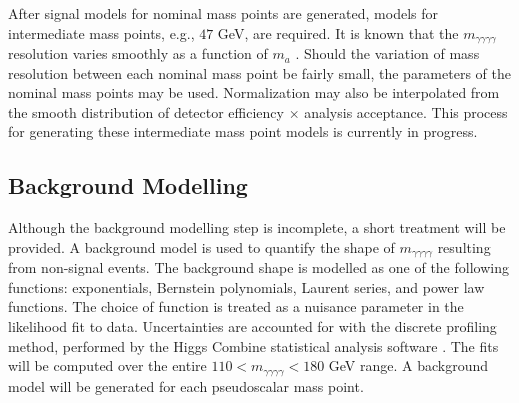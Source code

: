 \documentclass[12pt]{article}
\begin{document}

After signal models for nominal mass points are generated, models for intermediate mass points, e.g., $47$ GeV, are required. It is known that the $m_{\gamma\gamma\gamma\gamma}$ resolution varies smoothly as a function of $m_{a}$ \cite{Run2_analysis}. Should the variation of mass resolution between each nominal mass point be fairly small, the parameters of the nominal mass points may be used. Normalization may also be interpolated from the smooth distribution of detector efficiency $\times$ analysis acceptance. This process for generating these intermediate mass point models is currently in progress.\par

\subsection{Background Modelling}
Although the background modelling step is incomplete, a short treatment will be provided. A background model is used to quantify the shape of $m_{\gamma\gamma\gamma\gamma}$ resulting from non-signal events. The background shape is modelled as one of the following functions: exponentials, Bernstein polynomials, Laurent series, and power law functions. The choice of function is treated as a nuisance parameter in the likelihood fit to data. Uncertainties are accounted for with the discrete profiling method, performed by the Higgs Combine statistical analysis software \cite{discrete-profiling, higgs-combine}. The fits will be computed over the entire $110 < m_{\gamma\gamma\gamma\gamma} < 180$ GeV range. A background model will be generated for each pseudoscalar mass point.\par
\end{document}

